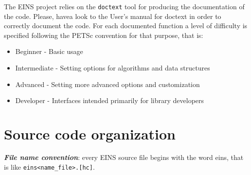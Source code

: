 \documentclass[a4paper,11pt]{report}
\begin{document}
The EINS project relies on the \verb!doctext! tool for producing the
documentation of the code. Please, havea look to the User's manual for
doctext \cite{doctext} in order to correctly document the code. For
each documented function a level of difficulty is specified following
the PETSc convention for that purpose, that is:  
\begin{itemize}[noitemsep,topsep=2pt,parsep=2pt,partopsep=2pt]
\item Beginner - Basic usage
\item Intermediate - Setting options for algorithms and data structures
\item Advanced - Setting more advanced options and customization
\item Developer - Interfaces intended primarily for library developers
\end{itemize}


\section{Source code organization}

\noindent \textit{\bf File name convention}: every EINS source file begins with the
word eins, that is like \verb!eins<name_file>.[hc]!.

\vspace{1em}
\end{document}

